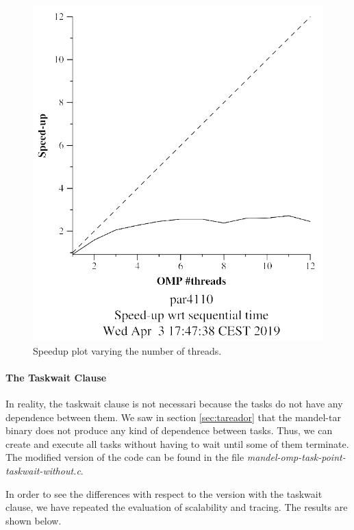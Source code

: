 \documentclass[12pt, a4paper]{article}
\begin{document}
\begin{figure}[H]
\begin{minipage}[b]{0.4\linewidth}
  \includegraphics[scale=0.5]{./mandel-omp-10000-strong-22-speedup}
  \caption{Speedup plot varying the number of threads.}
  \label{fig:mandel-omp-10000-strong-22-speedup}
\end{minipage}
\end{figure}

\paragraph{The Taskwait Clause}

\hfill

In reality, the taskwait clause is not necessari because the tasks do not have any dependence between them. We saw in section \ref{sec:tareador} that the mandel-tar binary does not produce any kind of dependence between tasks. Thus, we can create and execute all tasks without having to wait until some of them terminate. The modified version of the code can be found in the file \textit{mandel-omp-task-point-taskwait-without.c}.

In order to see the differences with respect to the version with the taskwait clause, we have repeated the evaluation of scalability and tracing. The results are shown below.
\end{document}
